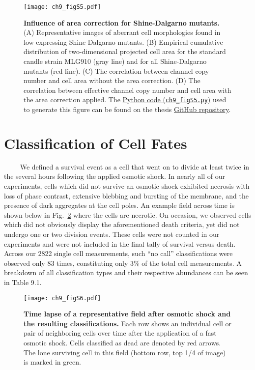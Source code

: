 \documentclass[12pt]{caltech_thesis}
\begin{document}
\hypertarget{fig:area_correction}{%
\begin{figure}
\centering
\texttt{[image: ch9\_figS5.pdf]}
\caption[{Influence of area correction for Shine-Dalgarno
mutants.}]{\textbf{Influence of area correction for Shine-Dalgarno
mutants.} (A) Representative images of aberrant cell morphologies found
in low-expressing Shine-Dalgarno mutants. (B) Empirical cumulative
distribution of two-dimensional projected cell area for the standard
candle strain MLG910 (gray line) and for all Shine-Dalgarno mutants (red
line). (C) The correlation between channel copy number and cell area
without the area correction. (D) The correlation between effective
channel copy number and cell area with the area correction applied. The
\href{https://github.com/gchure/phd/blob/master/src/chapter_09/code/ch9_figS5.py}{Python
code (\texttt{ch9\_figS5.py})} used to generate this figure can be found
on the thesis \href{https://github.com/gchure/phd}{GitHub repository}.}
\label{fig:area_correction}
\end{figure}
}

\hypertarget{classification-of-cell-fates}{%
\section{Classification of Cell
Fates}\label{classification-of-cell-fates}}

~~~~ We defined a survival event as a cell that went on to divide at
least twice in the several hours following the applied osmotic shock. In
nearly all of our experiments, cells which did not survive an osmotic
shock exhibited necrosis with loss of phase contrast, extensive blebbing
and bursting of the membrane, and the presence of dark aggregates at the
cell poles. An example field across time is shown below in
Fig.~\ref{fig:phase_death} where the cells are necrotic. On occasion, we
observed cells which did not obviously display the aforementioned death
criteria, yet did not undergo one or two division events. These cells
were not counted in our experiments and were not included in the final
tally of survival versus death. Across our 2822 single cell
measurements, such ``no call'' classifications were observed only 83
times, constituting only 3\% of the total cell measurements. A breakdown
of all classification types and their respective abundances can be seen
in Table 9.1.

\hypertarget{fig:phase_death}{%
\begin{figure}
\centering
\texttt{[image: ch9\_figS6.pdf]}
\caption[{Time lapse of a representative field after osmotic shock and
the resulting classifications.}]{\textbf{Time lapse of a representative
field after osmotic shock and the resulting classifications.} Each row
shows an individual cell or pair of neighboring cells over time after
the application of a fast osmotic shock. Cells classified as dead are
denoted by red arrows. The lone surviving cell in this field (bottom
row, top 1/4 of image) is marked in green.}
\label{fig:phase_death}
\end{figure}
}
\end{document}
